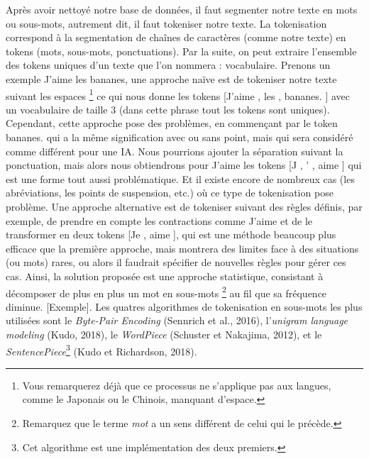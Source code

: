 \documentclass[12pt, french, twoside]{report}
\begin{document}
Après avoir nettoyé notre base de données, il faut segmenter notre texte en mots ou sous-mots, autrement dit, il faut tokeniser notre texte. La tokenisation correspond à la segmentation de chaînes de caractères (comme notre texte) en tokens (mots, sous-mots, ponctuations). Par la suite, on peut extraire l'ensemble des tokens uniques d'un texte que l'on nommera : vocabulaire.
Prenons un exemple \og J'aime les bananes\fg, une approche naïve est de tokeniser notre texte suivant les espaces \footnote{Vous remarquerez déjà que ce processus ne s'applique pas aux langues, comme le Japonais ou le Chinois, manquant d'espace.} ce qui nous donne les tokens [\og J'aime \fg, \og les \fg, \og bananes. \fg] avec un vocabulaire de taille 3 (dans cette phrase tout les tokens sont uniques). Cependant, cette approche pose des problèmes, en commençant par le token \og bananes. \fg qui a la même signification avec ou sans point, mais qui sera considéré comme différent pour une IA. Nous pourrions ajouter la séparation suivant la ponctuation, mais alors nous obtiendrons pour \og J'aime \fg les tokens [\og J \fg, \og ' \fg, \og aime \fg] qui est une forme tout aussi problématique. Et il existe encore de nombreux cas (les abréviations, les points de suspension, etc.) où ce type de tokenisation pose problème. Une approche alternative est de tokeniser suivant des règles définis, par exemple, de prendre en compte les contractions comme \og J'aime \fg et de le transformer en deux tokens [\og Je \fg, \og aime \fg], qui est une méthode beaucoup plus efficace que la première approche, mais montrera des limites face à des situations (ou mots) rares, ou alors il faudrait spécifier de nouvelles règles pour gérer ces cas. Ainsi, la solution proposée est une approche statistique, consistant à décomposer de plus en plus un mot en sous-mots \footnote{Remarquez que le terme \textit{mot} a un sens différent de celui qui le précède.} au fil que sa fréquence diminue. [Exemple]. Les quatres algorithmes de tokenisation en sous-mots les plus utilisées sont le \textit{Byte-Pair Encoding} (Sennrich et al., 2016), l'\textit{unigram language modeling} (Kudo, 2018), le \textit{WordPiece} (Schuster et Nakajima, 2012), et le \textit{SentencePiece}\footnote{Cet algorithme est une implémentation des deux premiers.} (Kudo et Richardson, 2018).\cite{jurafsky_regular}\\
\end{document}
